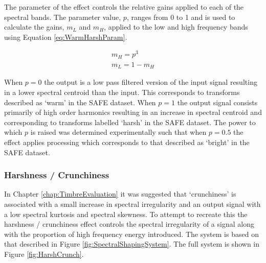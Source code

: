 			The parameter of the effect controls the relative gains applied to each of the spectral bands. The
			parameter value, $p$, ranges from 0 to 1 and is used to calculate the gains, $m_{L}$ and $m_{H}$,
			applied to the low and high frequency bands using Equation \ref{eq:WarmHarshParam}.

			\begin{gather}
				m_{H} = p^{3} \nonumber \\
				m_{L} = 1 - m_{H}
				\label{eq:WarmHarshParam}
			\end{gather}

			When $p = 0$  the output is a low pass filtered version of the input signal resulting in a lower
			spectral centroid than the input. This corresponds to transforms  described as `warm' in the SAFE
			dataset. When $p = 1$ the output signal consists primarily of high order harmonics resulting in an
			increase in spectral centroid and corresponding to transforms labelled `harsh' in the SAFE dataset.
			The power to which $p$ is raised was determined experimentally such that when $p = 0.5$ the effect
			applies processing which corresponds to that described as `bright' in the SAFE dataset. 

		\subsubsection*{Harshness / Crunchiness}
			In Chapter \ref{chap:TimbreEvaluation} it was suggested that `crunchiness' is associated with a
			small increase in spectral irregularity and an output signal with a low spectral kurtosis and
			spectral skewness. To attempt to recreate this the harshness / crunchiness effect controls the
			spectral irregularity of a signal along with the proportion of high frequency energy introduced.
			The system is based on that described in Figure \ref{fig:SpectralShapingSystem}. The full system is
			shown in Figure \ref{fig:HarshCrunch}.

